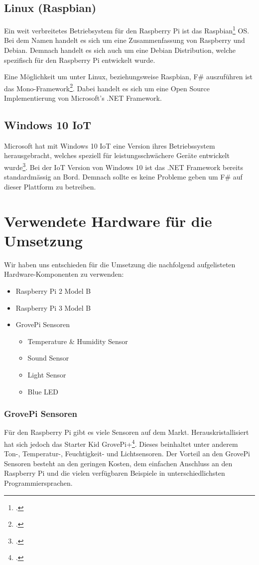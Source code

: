 \subsection{Linux (Raspbian)}
Ein weit verbreitetes Betriebsystem für den Raspberry Pi ist das Raspbian\footcite{FrontPage_-_Raspbian_2016-04-24} OS. Bei dem Namen handelt es sich um eine Zusammenfassung von Raspberry und Debian. Demnach handelt es sich auch um eine Debian Distribution, welche spezifisch für den Raspberry Pi entwickelt wurde.

Eine Möglichkeit um unter Linux, beziehungsweise Raspbian, F\# auszuführen ist das Mono-Framework\footcite{Mono_2016-04-24}. Dabei handelt es sich um eine Open Source Implementierung von Microsoft's .NET Framework.

\subsection{Windows 10 IoT}
Microsoft hat mit Windows 10 IoT eine Version ihres Betriebssystem herausgebracht, welches speziell für leistungsschwächere Geräte entwickelt wurde\footcite{Windows_IoT_2016-04-24}. Bei der IoT Version von Windows 10 ist das .NET Framework bereits standardmässig an Bord. Demnach sollte es keine Probleme geben um F\# auf dieser Plattform zu betreiben.



\section{Verwendete Hardware für die Umsetzung}
Wir haben uns entschieden für die Umsetzung die nachfolgend aufgelisteten Hardware-Komponenten zu verwenden:
\begin{itemize}
\item Raspberry Pi 2 Model B
\item Raspberry Pi 3 Model B
\item GrovePi Sensoren
\begin{itemize}
\item Temperature \& Humidity Sensor
\item Sound Sensor
\item Light Sensor
\item Blue LED
\end{itemize}
\end{itemize}


\subsubsection{GrovePi Sensoren}
Für den Raspberry Pi gibt es viele Sensoren auf dem Markt. Herauskristallisiert hat sich jedoch das Starter Kid GrovePi+\footcite{GrovePi_2016-04-24}. Dieses beinhaltet unter anderem Ton-, Temperatur-, Feuchtigkeit- und Lichtsensoren. Der Vorteil an den GrovePi Sensoren besteht an den geringen Kosten, dem einfachen Anschluss an den Raspberry Pi und die vielen verfügbaren Beispiele in unterschiedlichsten Programmiersprachen.


